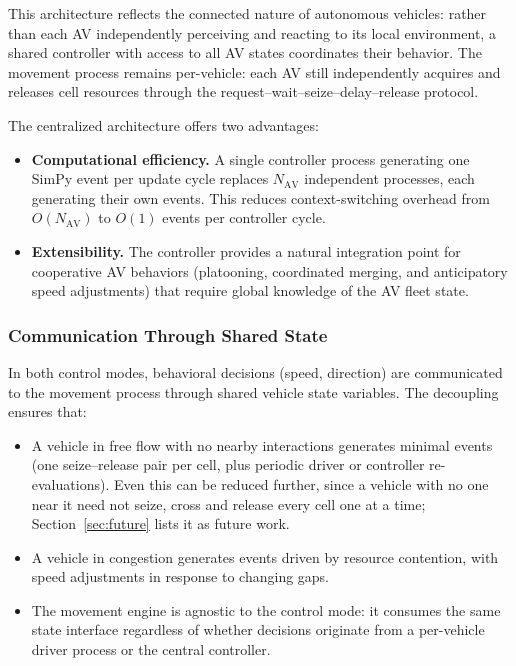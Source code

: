 \documentclass[review,number]{elsarticle}
\begin{document}
This architecture reflects the connected nature of autonomous vehicles: rather than each AV independently perceiving and reacting to its local environment, a shared controller with access to all AV states coordinates their behavior. The movement process remains per-vehicle: each AV still independently acquires and releases cell resources through the request--wait--seize--delay--release protocol.

The centralized architecture offers two advantages:
\begin{itemize}
    \item \textbf{Computational efficiency.} A single controller process generating one SimPy event per update cycle replaces $N_{\text{AV}}$ independent processes, each generating their own events. This reduces context-switching overhead from $O(N_{\text{AV}})$ to $O(1)$ events per controller cycle.
    \item \textbf{Extensibility.} The controller provides a natural integration point for cooperative AV behaviors (platooning, coordinated merging, and anticipatory speed adjustments) that require global knowledge of the AV fleet state.
\end{itemize}

\subsubsection{Communication Through Shared State}

In both control modes, behavioral decisions (speed, direction) are communicated to the movement process through shared vehicle state variables. The decoupling ensures that:

\begin{itemize}
    \item A vehicle in free flow with no nearby interactions generates minimal events (one seize--release pair per cell, plus periodic driver or controller re-evaluations). Even this can be reduced further, since a vehicle with no one near it need not seize, cross and release every cell one at a time; Section~\ref{sec:future} lists it as future work.
    \item A vehicle in congestion generates events driven by resource contention, with speed adjustments in response to changing gaps.
    \item The movement engine is agnostic to the control mode: it consumes the same state interface regardless of whether decisions originate from a per-vehicle driver process or the central controller.
\end{itemize}
\end{document}

